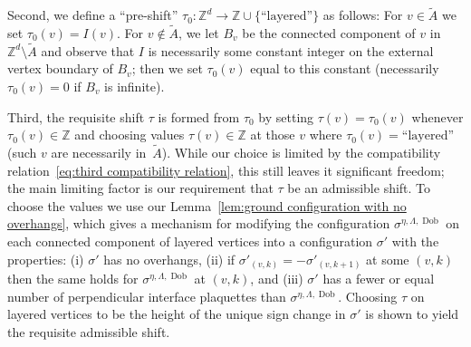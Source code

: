 \documentclass[11pt, reqno]{amsart}
\newcommand{\Z}{\mathbb{Z}}
\DeclareMathOperator{\Dob}{Dob}
\numberwithin{equation}{section}
\begin{document}
Second, we define a ``pre-shift'' $\tau_0:\Z^d\to\Z\cup\{\text{``layered''}\}$ as follows: For $v\in\tilde{A}$ we set $\tau_0(v)=I(v)$. For $v\notin\tilde{A}$, we let $B_v$
be the connected component of $v$ in $\Z^d\setminus\tilde{A}$ and observe that $I$ is necessarily some constant integer on the external vertex boundary of $B_v$; then we set $\tau_0(v)$ equal to this constant (necessarily $\tau_0(v)=0$ if $B_v$ is infinite). 

Third, the requisite shift $\tau$ is formed from $\tau_0$ by setting $\tau(v)=\tau_0(v)$ whenever $\tau_0(v)\in\Z$ and choosing values $\tau(v)\in\Z$ at those $v$ where $\tau_0(v)=\text{``layered''}$ (such $v$ are necessarily in~$\tilde{A}$). While our choice is limited by the compatibility relation~\eqref{eq:third compatibility relation}, this still leaves it significant freedom; the main limiting factor is our requirement that $\tau$ be an admissible shift. To choose the values we use our Lemma~\ref{lem:ground configuration with no overhangs}, which gives a mechanism for modifying the configuration $\sigma^{\eta,\Lambda,\Dob}$ on each connected component of layered vertices into a configuration $\sigma'$ with the properties: (i) $\sigma'$ has no overhangs,  (ii) if $\sigma'_{(v,k)}=-\sigma'_{(v,k+1)}$ at some $(v,k)$ then the same holds for $\sigma^{\eta,\Lambda,\Dob}$ at $(v,k)$, and (iii) $\sigma'$ has a fewer or equal number of perpendicular interface plaquettes than $\sigma^{\eta,\Lambda,\Dob}$.
Choosing $\tau$ on layered vertices to be the height of the unique sign change in $\sigma'$ is shown to yield the requisite admissible shift.

\smallskip
\end{document}
